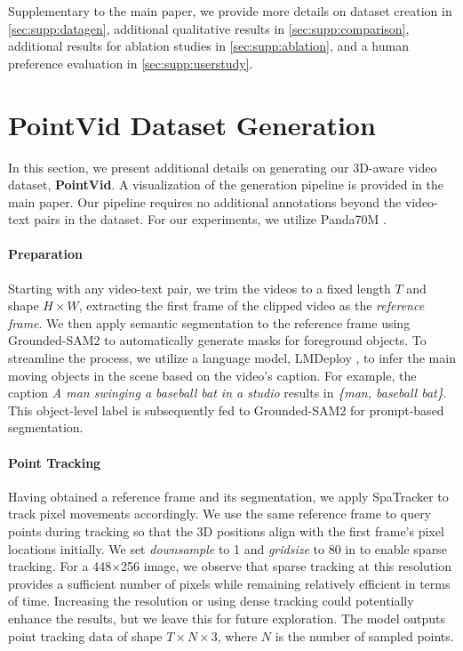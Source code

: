 \clearpage
\maketitlesupplementary

\begin{appendix}
Supplementary to the main paper, we provide more details on dataset creation in \autoref{sec:supp:datagen}, additional qualitative results in \autoref{sec:supp:comparison}, additional results for ablation studies in \autoref{sec:supp:ablation}, and a human preference evaluation in \autoref{sec:supp:userstudy}.


\section{PointVid Dataset Generation}
\label{sec:supp:datagen}
In this section, we present additional details on generating our 3D-aware video dataset, \textbf{PointVid}. A visualization of the generation pipeline is provided in the main paper. Our pipeline requires no additional annotations beyond the video-text pairs in the dataset. For our experiments, we utilize Panda70M \cite{chen2024panda}.

\paragraph{Preparation}
Starting with any video-text pair, we trim the videos to a fixed length $T$ and shape $H\times W$, extracting the first frame of the clipped video as the \textit{reference frame}. We then apply semantic segmentation to the reference frame using Grounded-SAM2 \cite{ren2024grounded, ravi2024sam2segmentimages} to automatically generate masks for foreground objects. To streamline the process, we utilize a language model, LMDeploy \cite{2023lmdeploy}, to infer the main moving objects in the scene based on the video's caption. For example, the caption \textit{A man swinging a baseball bat in a studio} results in \textit{\{man, baseball bat\}}. This object-level label is subsequently fed to Grounded-SAM2 for prompt-based segmentation.

\paragraph{Point Tracking}
Having obtained a reference frame and its segmentation, we apply SpaTracker \cite{xiao2024spatialtracker} to track pixel movements accordingly. We use the same reference frame to query points during tracking so that the 3D positions align with the first frame's pixel locations initially. We set \textit{downsample} to 1 and \textit{gridsize} to 80 in \cite{xiao2024spatialtracker} to enable sparse tracking. For a 448$\times$256 image, we observe that sparse tracking at this resolution provides a sufficient number of pixels while remaining relatively efficient in terms of time. Increasing the resolution or using dense tracking could potentially enhance the results, but we leave this for future exploration. The model outputs point tracking data of shape $T \times N \times 3$, where $N$ is the number of sampled points.


\end{appendix}
